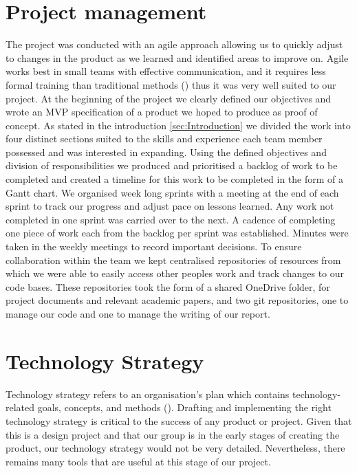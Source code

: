 \section{Project management}
\label{sec:Project management}
The project was conducted with an agile approach allowing us to quickly adjust to changes in the product as we learned and identified areas to improve on.
Agile works best in small teams with effective communication, and it requires less formal training than traditional methods (\cite{Agile}) thus it was very well suited to our project. 
At the beginning of the project we clearly defined our objectives and wrote an MVP specification of a product we hoped to produce as proof of concept.
As stated in the introduction \cref{sec:Introduction} we divided the work into four distinct sections suited to the skills and experience each team member possessed and was interested in expanding.
Using the defined objectives and division of responsibilities we produced and prioritised a backlog of work to be completed and created a timeline for this work to be completed in the form of a Gantt chart.
We organised week long sprints with a meeting at the end of each sprint to track our progress and adjust pace on lessons learned. 
Any work not completed in one sprint was carried over to the next.
A cadence of completing one piece of work each from the backlog per sprint was established.
Minutes were taken in the weekly meetings to record important decisions.
To ensure collaboration within the team we kept centralised repositories of resources from which we were able to easily access other peoples work and track changes to our code bases.
These repositories took the form of a shared OneDrive folder, for project documents and relevant academic papers, and two git repositories, one to manage our code and one to manage the writing of our report.


\section{Technology Strategy}
\label{sec:techstrategy}
Technology strategy refers to an organisation's plan which contains technology-related goals, concepts, and methods (\cite{techstratdefinition}). Drafting and implementing the right technology strategy is critical to the success of any product or project. Given that this is a design project and that our group is in the early stages of creating the product, our technology strategy would not be very detailed. Nevertheless, there remains many tools that are useful at this stage of our project.

